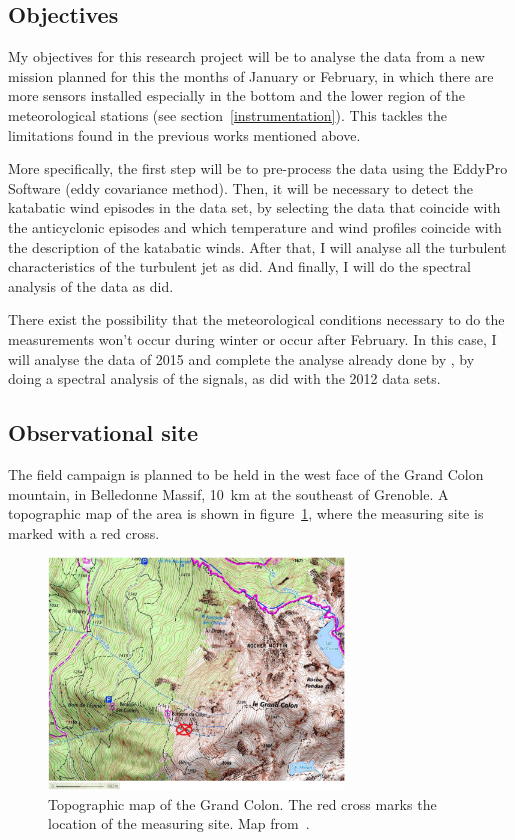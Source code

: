 \documentclass[a4paper,12pt]{article}
\begin{document}
\subsection{Objectives}
My objectives for this research project will be to analyse the data from a new mission planned for this the months of January or February, in which there are more sensors installed especially in the bottom and the lower region of the meteorological stations (see section~\ref{instrumentation}). This tackles the limitations found in the previous works mentioned above. 

More specifically, the first step will be to pre-process the data using the EddyPro Software (eddy covariance method). Then, it will be necessary to detect the katabatic wind episodes in the data set, by selecting the data that coincide with the anticyclonic episodes and which temperature and wind profiles coincide with the description of the katabatic winds. After that, I will analyse all the turbulent characteristics of the turbulent jet as \citeauthor{jakob} did. And finally, I will do the spectral analysis of the data as \citeauthor{claudine} did. 

There exist the possibility that the meteorological conditions necessary to do the measurements won't occur during winter or occur after February. In this case, I will analyse the data of 2015 and complete the analyse already done by \citeauthor{jakob}, by doing a spectral analysis of the signals, as \citeauthor{claudine} did with the 2012 data sets.

\subsection{Observational site}

The field campaign is planned to be held in the west face of the Grand Colon mountain, in Belledonne Massif, 10~km at the southeast of Grenoble. A topographic map of the area is shown in figure~\ref{fig:obs_site}, where the measuring site is marked with a red cross.

\begin{figure}[!ht]
  \begin{center}
  \includegraphics[width=0.7\textwidth]{fig/grand_colon_jakob.png}
  \caption{Topographic map of the Grand Colon. The red cross marks the location of the measuring site. Map from~\cite{jakob}.}
  \label{fig:obs_site}
  \end{center}
\end{figure}
\end{document}
